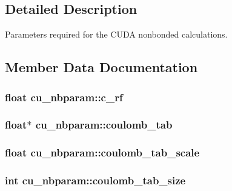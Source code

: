 \subsection{\-Detailed \-Description}
\-Parameters required for the \-C\-U\-D\-A nonbonded calculations. 

\subsection{\-Member \-Data \-Documentation}
\hypertarget{structcu__nbparam_aaf9b3b307c545595165187542d9b7ae2}{
\subsubsection[{c\-\_\-rf}]{\setlength{\rightskip}{0pt plus 5cm}float {\bf cu\-\_\-nbparam\-::c\-\_\-rf}}}\label{structcu__nbparam_aaf9b3b307c545595165187542d9b7ae2}
\hypertarget{structcu__nbparam_a2231820afdcd8efe6847cfd359c9f159}{
\subsubsection[{coulomb\-\_\-tab}]{\setlength{\rightskip}{0pt plus 5cm}float$\ast$ {\bf cu\-\_\-nbparam\-::coulomb\-\_\-tab}}}\label{structcu__nbparam_a2231820afdcd8efe6847cfd359c9f159}
\hypertarget{structcu__nbparam_a758aab743ead1fce2b8038f664d973f3}{
\subsubsection[{coulomb\-\_\-tab\-\_\-scale}]{\setlength{\rightskip}{0pt plus 5cm}float {\bf cu\-\_\-nbparam\-::coulomb\-\_\-tab\-\_\-scale}}}\label{structcu__nbparam_a758aab743ead1fce2b8038f664d973f3}
\hypertarget{structcu__nbparam_aae7fd01c1f79256496d3ce7d8ca15274}{
\subsubsection[{coulomb\-\_\-tab\-\_\-size}]{\setlength{\rightskip}{0pt plus 5cm}int {\bf cu\-\_\-nbparam\-::coulomb\-\_\-tab\-\_\-size}}}\label{structcu__nbparam_aae7fd01c1f79256496d3ce7d8ca15274}
